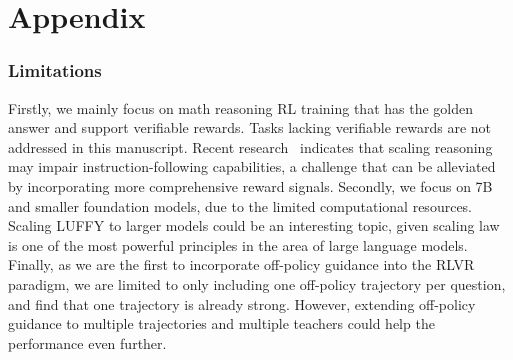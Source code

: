 
\clearpage
\appendix  %

\part*{Appendix}

\startcontents[appendix]

\section{Limitations}
\label{app:limitation}
Firstly, we mainly focus on math reasoning RL training that has the golden answer and support verifiable rewards. 
Tasks lacking verifiable rewards are not addressed in this manuscript.
Recent research~\cite{fu2025scaling} indicates that scaling reasoning may impair instruction-following capabilities, a challenge that can be alleviated by incorporating more comprehensive reward signals. 
Secondly, we focus on 7B and smaller foundation models, due to the limited computational resources. Scaling LUFFY to larger models could be an interesting topic, given scaling law~\cite{scaling_law1,scaling_law2} is one of the most powerful principles in the area of large language models. 
Finally, as we are the first to incorporate off-policy guidance into the RLVR paradigm, we are limited to only including one off-policy trajectory per question, and find that one trajectory is already strong. However, extending off-policy guidance to multiple trajectories and multiple teachers could help the performance even further. 

